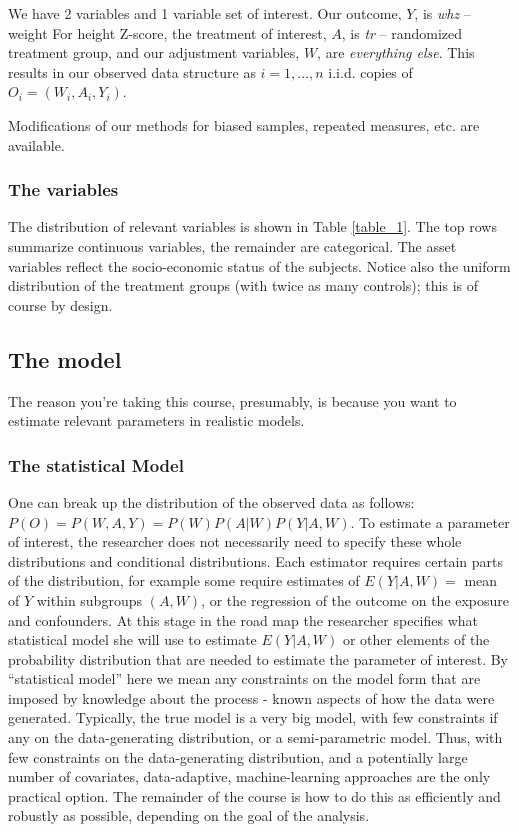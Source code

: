 \documentclass[]{article}
\begin{document}
We have 2 variables and 1 variable set of interest. Our outcome, \(Y\),
is \emph{whz} -- weight For height Z-score, the treatment of interest,
\(A\), is \emph{tr} -- randomized treatment group, and our adjustment
variables, \(W\), are \emph{everything else}. This results in our
observed data structure as \(i=1,...,n\) i.i.d. copies of
\(O_i = (W_i,A_i,Y_i)\).

Modifications of our methods for biased samples, repeated measures, etc.
are available.

\hypertarget{the-variables}{%
\subsubsection{The variables}\label{the-variables}}



The distribution of relevant variables is shown in Table \ref{table_1}.
The top rows summarize continuous variables, the remainder are
categorical. The asset variables reflect the socio-economic status of
the subjects. Notice also the uniform distribution of the treatment
groups (with twice as many controls); this is of course by design.

\hypertarget{the-model}{%
\subsection{The model}\label{the-model}}

The reason you're taking this course, presumably, is because you want to
estimate relevant parameters in realistic models.

\hypertarget{the-statistical-model}{%
\subsubsection{The statistical Model}\label{the-statistical-model}}

One can break up the distribution of the observed data as follows:
\(P(O)=P(W,A,Y)=P(W)P(A|W)P(Y|A,W)\). To estimate a parameter of
interest, the researcher does not necessarily need to specify these
whole distributions and conditional distributions. Each estimator
requires certain parts of the distribution, for example some require
estimates of \(E(Y|A,W)=\) mean of \(Y\) within subgroups \((A,W)\), or
the regression of the outcome on the exposure and confounders. At this
stage in the road map the researcher specifies what statistical model
she will use to estimate \(E(Y|A,W)\) or other elements of the
probability distribution that are needed to estimate the parameter of
interest. By ``statistical model'' here we mean any constraints on the
model form that are imposed by knowledge about the process - known
aspects of how the data were generated. Typically, the true model is a
very big model, with few constraints if any on the data-generating
distribution, or a semi-parametric model. Thus, with few constraints on
the data-generating distribution, and a potentially large number of
covariates, data-adaptive, machine-learning approaches are the only
practical option. The remainder of the course is how to do this as
efficiently and robustly as possible, depending on the goal of the
analysis.
\end{document}
